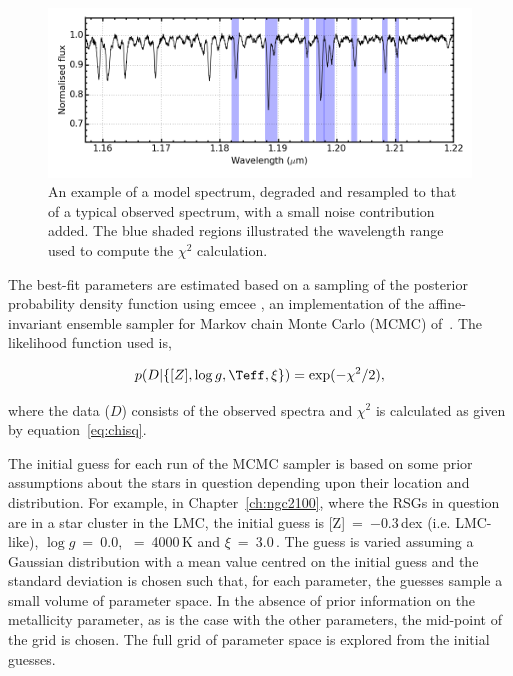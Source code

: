 \begin{figure}
 \centering
 \includegraphics[width=\textwidth]{JAnal/Diag-lines}
 \caption[A model spectrum highlighting the diagnostic lines used in the analysis routines]{
An example of a model spectrum, degraded and resampled to that of a typical observed spectrum, with a small noise contribution added.
The blue shaded regions illustrated the wavelength range used to compute the $\chi^{2}$ calculation.
\label{fig:lines}
         }
\end{figure}


The best-fit parameters are estimated based on a sampling of the posterior probability density function using {\sc emcee}
\cite{2013PASP..125..306F},
an implementation of the affine-invariant ensemble sampler for Markov chain Monte Carlo (MCMC) of~\cite{2010CAMCS.5..65G}.
The likelihood function used is,

\begin{equation}
    p(D|\{[Z], \log g, \Teff, \xi\}) = \exp(-\chi^{2}/2), \label{eq:like}
\end{equation}

where the data ($D$) consists of the observed spectra and $\chi^{2}$ is calculated as given by equation~\ref{eq:chisq}.

The initial guess for each run of the MCMC sampler is based on some prior assumptions about the stars in question depending upon their location and distribution.
For example, in Chapter~\ref{ch:ngc2100}, where the RSGs in question are in a star cluster in the LMC, the initial guess is [Z]~=~$-$0.3\,dex (i.e. LMC-like), $\log g$~=~0.0, \Teff~=~4000\,K and $\xi$~=~3.0\,\kms.
The guess is varied assuming a Gaussian distribution with a mean value centred on the initial guess and the standard deviation is chosen such that, for each parameter, the guesses sample a small volume of parameter space.
In the absence of prior information on the metallicity parameter, as is the case with the other parameters, the mid-point of the grid is chosen.
The full grid of parameter space is explored from the initial guesses.

